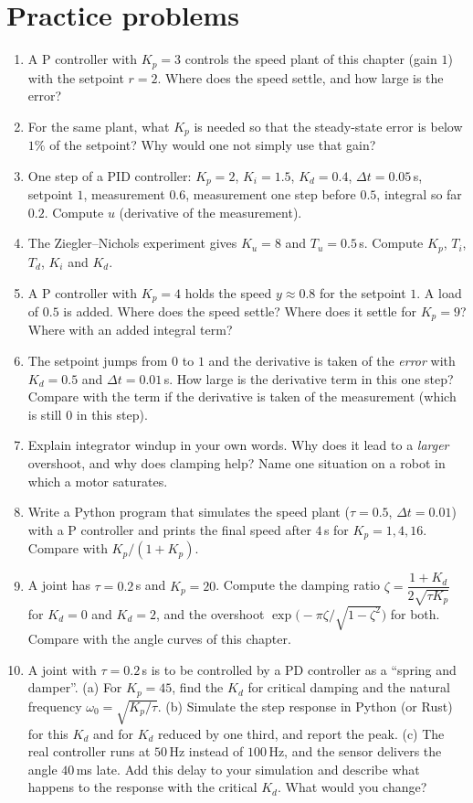 \section*{Practice problems}
\begin{enumerate}[label=\textbf{\thechapter.\arabic*}]
  \item A P controller with $K_p=3$ controls the speed plant of this chapter (gain $1$) with the setpoint $r=2$. Where does the speed settle, and how large is the error?
  \item For the same plant, what $K_p$ is needed so that the steady-state error is below $1\%$ of the setpoint? Why would one not simply use that gain?
  \item One step of a PID controller: $K_p=2$, $K_i=1.5$, $K_d=0.4$, $\Delta t=0.05$\,s, setpoint $1$, measurement $0.6$, measurement one step before $0.5$, integral so far $0.2$. Compute $u$ (derivative of the measurement).
  \item The Ziegler--Nichols experiment gives $K_u=8$ and $T_u=0.5$\,s. Compute $K_p$, $T_i$, $T_d$, $K_i$ and $K_d$.
  \item A P controller with $K_p=4$ holds the speed $y\approx0.8$ for the setpoint $1$. A load of $0.5$ is added. Where does the speed settle? Where does it settle for $K_p=9$? Where with an added integral term?
  \item The setpoint jumps from $0$ to $1$ and the derivative is taken of the \emph{error} with $K_d=0.5$ and $\Delta t=0.01$\,s. How large is the derivative term in this one step? Compare with the term if the derivative is taken of the measurement (which is still $0$ in this step).
  \item Explain integrator windup in your own words. Why does it lead to a \emph{larger} overshoot, and why does clamping help? Name one situation on a robot in which a motor saturates.
  \item Write a Python program that simulates the speed plant ($\tau=0.5$, $\Delta t=0.01$) with a P controller and prints the final speed after $4$\,s for $K_p=1,4,16$. Compare with $K_p/(1+K_p)$.
  \item A joint has $\tau=0.2$\,s and $K_p=20$. Compute the damping ratio $\zeta=\dfrac{1+K_d}{2\sqrt{\tau K_p}}$ for $K_d=0$ and $K_d=2$, and the overshoot $\exp\!\bigl(-\pi\zeta/\sqrt{1-\zeta^2}\bigr)$ for both. Compare with the angle curves of this chapter.
  \item[\textbf{\thechapter.10}$\star$] A joint with $\tau=0.2$\,s is to be controlled by a PD controller as a ``spring and damper''. (a) For $K_p=45$, find the $K_d$ for critical damping and the natural frequency $\omega_0=\sqrt{K_p/\tau}$. (b) Simulate the step response in Python (or Rust) for this $K_d$ and for $K_d$ reduced by one third, and report the peak. (c) The real controller runs at $50$\,Hz instead of $100$\,Hz, and the sensor delivers the angle $40$\,ms late. Add this delay to your simulation and describe what happens to the response with the critical $K_d$. What would you change?
\end{enumerate}
